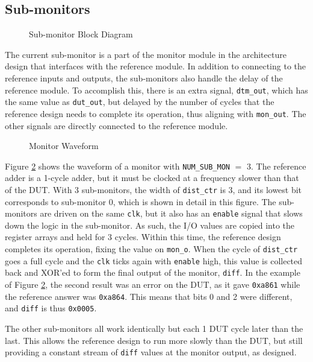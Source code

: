 \subsection{Sub-monitors}

\begin{figure}[H]
  \centering
  
  \caption{Sub-monitor Block Diagram}
  \label{SubmonBlk}
\end{figure}

The current sub-monitor is a part of the monitor module in the architecture design that interfaces with the reference module.
In addition to connecting to the reference inputs and outputs, the sub-monitors also handle the delay of the reference module.
To accomplish this, there is an extra signal, \texttt{dtm\_out}, which has the same value as \texttt{dut\_out}, but delayed by the number of cycles that the reference design needs to complete its operation, thus aligning with \texttt{mon\_out}.
The other signals are directly connected to the reference module.

\begin{figure}[H]
  \centering
  
  \caption{Monitor Waveform}
  \label{MonitorWave}
\end{figure}

Figure \ref{MonitorWave} shows the waveform of a monitor with \texttt{NUM\_SUB\_MON} $=$ 3.
The reference adder is a 1-cycle adder, but it must be clocked at a frequency slower than that of the DUT.
With 3 sub-monitors, the width of \texttt{dist\_ctr} is 3, and its lowest bit corresponds to sub-monitor 0, which is shown in detail in this figure.
The sub-monitors are driven on the same \texttt{clk}, but it also has an \texttt{enable} signal that slows down the logic in the sub-monitor.
As such, the I/O values are copied into the register arrays and held for 3 cycles.
Within this time, the reference design completes its operation, fixing the value on \texttt{mon\_o}.
When the cycle of \texttt{dist\_ctr} goes a full cycle and the \texttt{clk} ticks again with \texttt{enable} high, this value is collected back and XOR'ed to form the final output of the monitor, \texttt{diff}.
In the example of Figure \ref{MonitorWave}, the second result was an error on the DUT, as it gave \texttt{0xa861} while the reference answer was \texttt{0xa864}.
This means that bits 0 and 2 were different, and \texttt{diff} is thus \texttt{0x0005}.

The other sub-monitors all work identically but each 1 DUT cycle later than the last.
This allows the reference design to run more slowly than the DUT, but still providing a constant stream of \texttt{diff} values at the monitor output, as designed.

